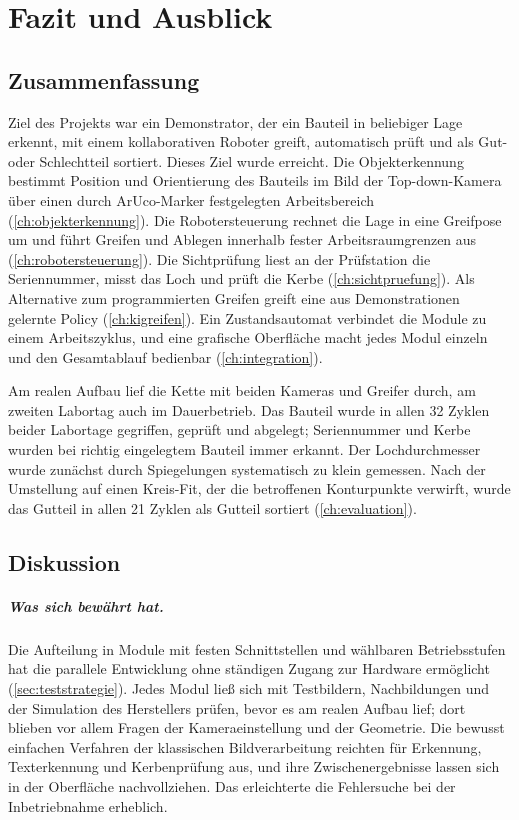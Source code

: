 \chapter{Fazit und Ausblick}
\label{ch:fazit}

\section{Zusammenfassung}

Ziel des Projekts war ein Demonstrator, der ein Bauteil in beliebiger Lage erkennt, mit einem
kollaborativen Roboter greift, automatisch prüft und als Gut- oder Schlechtteil sortiert. Dieses
Ziel wurde erreicht. Die Objekterkennung bestimmt Position und Orientierung des Bauteils im Bild
der Top-down-Kamera über einen durch ArUco-Marker festgelegten Arbeitsbereich
(\cref{ch:objekterkennung}). Die Robotersteuerung rechnet die Lage in eine Greifpose um und führt
Greifen und Ablegen innerhalb fester Arbeitsraumgrenzen aus (\cref{ch:robotersteuerung}). Die
Sichtprüfung liest an der Prüfstation die Seriennummer, misst das Loch und prüft die Kerbe
(\cref{ch:sichtpruefung}). Als Alternative zum programmierten Greifen greift eine aus
Demonstrationen gelernte Policy (\cref{ch:kigreifen}). Ein Zustandsautomat verbindet die Module
zu einem Arbeitszyklus, und eine grafische Oberfläche macht jedes Modul einzeln und den
Gesamtablauf bedienbar (\cref{ch:integration}).

Am realen Aufbau lief die Kette mit beiden Kameras und Greifer durch, am zweiten Labortag auch
im Dauerbetrieb. Das Bauteil wurde in allen 32 Zyklen beider Labortage gegriffen, geprüft und
abgelegt; Seriennummer und Kerbe wurden bei richtig eingelegtem Bauteil immer erkannt. Der
Lochdurchmesser wurde zunächst durch Spiegelungen systematisch zu klein gemessen. Nach der
Umstellung auf einen Kreis-Fit, der die betroffenen Konturpunkte verwirft, wurde das Gutteil in
allen 21 Zyklen als Gutteil sortiert (\cref{ch:evaluation}).

\section{Diskussion}
\label{sec:diskussion}

\paragraph{Was sich bewährt hat.} Die Aufteilung in Module mit festen Schnittstellen und
wählbaren Betriebsstufen hat die parallele Entwicklung ohne ständigen Zugang zur Hardware
ermöglicht (\cref{sec:teststrategie}). Jedes Modul ließ sich mit Testbildern, Nachbildungen und
der Simulation des Herstellers prüfen, bevor es am realen Aufbau lief; dort blieben vor allem
Fragen der Kameraeinstellung und der Geometrie. Die bewusst einfachen Verfahren der klassischen
Bildverarbeitung reichten für Erkennung, Texterkennung und Kerbenprüfung aus, und ihre
Zwischenergebnisse lassen sich in der Oberfläche nachvollziehen. Das erleichterte die Fehlersuche
bei der Inbetriebnahme erheblich.

